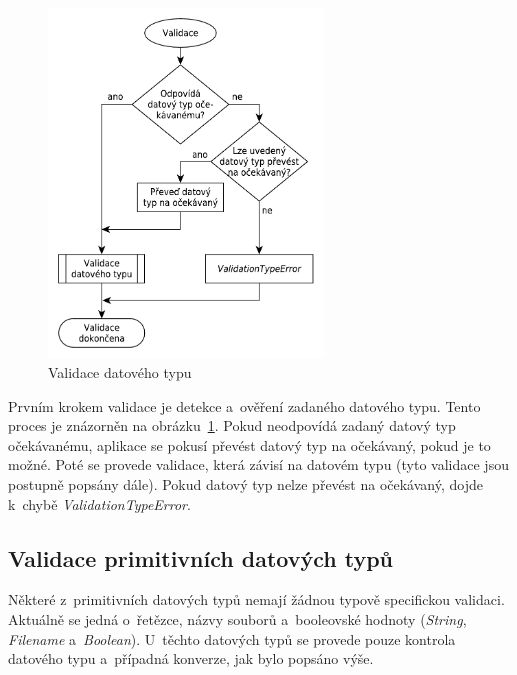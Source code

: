 \documentclass[FM,bw,DP]{tulthesis}
\begin{document}
\begin{figure}[h]
	\centering
    \includegraphics[width=0.65\textwidth]{../img/validation_type.pdf}
    \caption{Validace datového typu}
	\label{img:validation_type}
\end{figure}

Prvním krokem validace je detekce a~ověření zadaného datového typu. Tento proces je znázorněn na obrázku~\ref{img:validation_type}. Pokud neodpovídá zadaný datový typ očekávanému, aplikace se pokusí převést datový typ na očekávaný, pokud je to možné. Poté se provede validace, která závisí na datovém typu (tyto validace jsou postupně popsány dále). Pokud datový typ nelze převést na očekávaný, dojde k~chybě \textit{ValidationTypeError}. 

\subsection{Validace primitivních datových typů}

Některé z~primitivních datových typů nemají žádnou typově specifickou validaci. Aktuálně se jedná o~řetězce, názvy souborů a~booleovské hodnoty (\textit{String}, \textit{Filename} a~\textit{Boolean}). U~těchto datových typů se provede pouze kontrola datového typu a~případná konverze, jak bylo popsáno výše.
\end{document}
